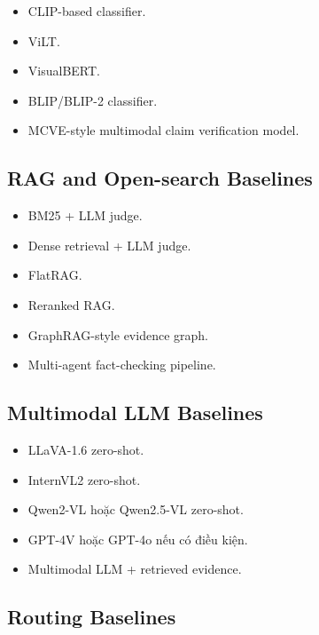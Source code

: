 \documentclass[11pt,a4paper]{article}
\begin{document}
\begin{itemize}[leftmargin=1.5em]
\item CLIP-based classifier.
\item ViLT.
\item VisualBERT.
\item BLIP/BLIP-2 classifier.
\item MCVE-style multimodal claim verification model.
\end{itemize}

\subsection{RAG and Open-search Baselines}

\begin{itemize}[leftmargin=1.5em]
\item BM25 + LLM judge.
\item Dense retrieval + LLM judge.
\item FlatRAG.
\item Reranked RAG.
\item GraphRAG-style evidence graph.
\item Multi-agent fact-checking pipeline.
\end{itemize}

\subsection{Multimodal LLM Baselines}

\begin{itemize}[leftmargin=1.5em]
\item LLaVA-1.6 zero-shot.
\item InternVL2 zero-shot.
\item Qwen2-VL hoặc Qwen2.5-VL zero-shot.
\item GPT-4V hoặc GPT-4o nếu có điều kiện.
\item Multimodal LLM + retrieved evidence.
\end{itemize}

\subsection{Routing Baselines}
\end{document}
